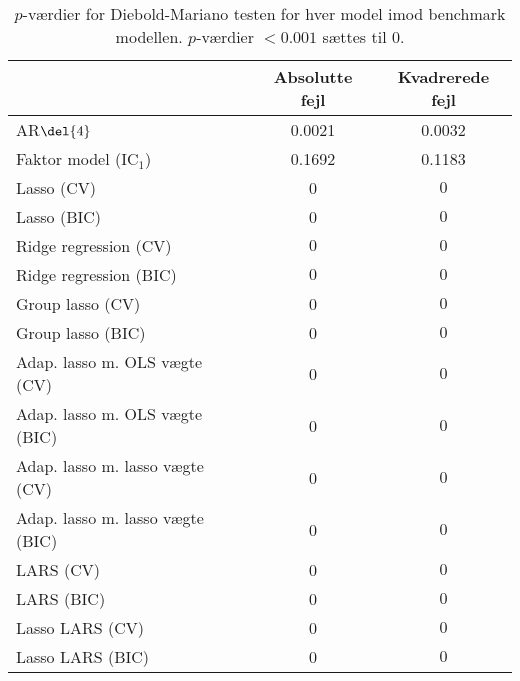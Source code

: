 \begin{table}[ht]
\center
\begin{tabular}{lcc}
\toprule
 & Absolutte fejl & Kvadrerede fejl \\ \midrule
AR\(\del{4}\) & 0.0021 & 0.0032 \\  
Faktor model (IC\(_1\)) & 0.1692 & 0.1183 \\
Lasso (CV) & 0 & $0$ \\
Lasso (BIC) & 0 & $0$ \\
Ridge regression (CV) & $0$  & $0$  \\
Ridge regression (BIC) &$0 $& $0$\\
Group lasso (CV) & 0 &$ 0$  \\
Group lasso (BIC) & 0& $0$ \\
Adap. lasso m. OLS vægte (CV) & 0& $0 $\\
Adap. lasso m. OLS vægte (BIC) & 0& $0$\\
Adap. lasso m. lasso vægte (CV) & 0 & $0 $\\
Adap. lasso m. lasso vægte (BIC) & 0& $0$\\
LARS (CV) & 0 & $0$  \\
LARS (BIC) & 0& $0$ \\
Lasso LARS (CV) & 0& $0$ \\
Lasso LARS (BIC) & 0& $0$ \\ \bottomrule
\end{tabular}
\caption{\(p\)-værdier for Diebold-Mariano testen for hver model imod benchmark modellen.
\(p\)-værdier \(< 0.001\) sættes til 0.} \label{tab:dm_test}
\end{table}
